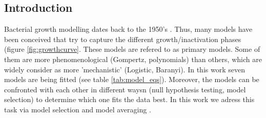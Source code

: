 \documentclass[titlepage,11pt]{article}
\begin{document}
	\begin{linenumbers}
		\section{Introduction}\label{sec:introduction}
		Bacterial growth modelling dates back to the 1950's \cite{Schaechter2015}. Thus, many models have been conceived that try to capture the different growth/inactivation phases (figure \ref{fig:growthcurve}. These models are refered to as primary models. Some of them are more phenomenological (Gompertz, polynomials) than others, which are widely consider as more 'mechanistic' (Logistic, Baranyi). In this work seven models are being fitted (see table \ref{tab:model_eqs}). Moreover, the models can be confronted with each other in different waysn (null hypothesis testing, model selection) to determine which one fits the data best. In this work we adress this task via model selection and model averaging \cite{Anderson2002, Johnson2004}. \\
		

\end{linenumbers}
\end{document}
